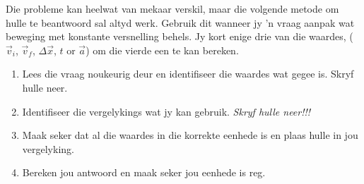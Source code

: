Die probleme kan heelwat van mekaar verskil, maar die volgende metode om hulle te beantwoord sal altyd werk. Gebruik dit wanneer jy 'n vraag aanpak wat beweging met konstante versnelling behels. Jy kort enige drie van die waardes, ($\vec{v}_{i}$, $\vec{v}_{f}$, $\Delta \vec{x}$, $t$ or $\vec{a}$) om die vierde een te kan bereken.\par

\begin{enumerate}[noitemsep, label=\textbf{\arabic*}. ] 
    \item Lees die vraag noukeurig deur en identifiseer die waardes wat gegee is. Skryf hulle neer.
    \item Identifiseer die vergelykings wat jy kan gebruik. \textsl{Skryf hulle neer!!!}
    \item Maak seker dat al die waardes in die korrekte eenhede is en plaas hulle in jou vergelyking.
    \item Bereken jou antwoord en maak seker jou eenhede is reg.
\end{enumerate}

	\par
      \label{m38796*uid134}
            
